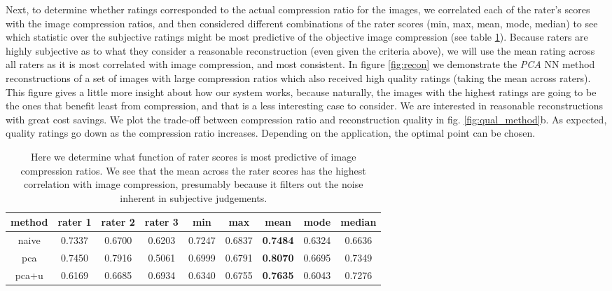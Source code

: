 Next, to determine whether ratings corresponded to the actual compression ratio for the images, we correlated each of the rater's scores with the image compression ratios, and then considered different combinations of the rater scores (min, max, mean, mode, median) to see which statistic over the subjective ratings might be most predictive of the objective image compression (see table \ref{tab:corr}). Because raters are highly subjective as to what they consider a reasonable reconstruction (even given the criteria above), we will use the mean rating across all raters as it is most correlated with image compression, and most consistent. In figure \ref{fig:recon} we demonstrate the \emph{PCA} NN method reconstructions of a set of images with large compression ratios which also received high quality ratings (taking the mean across raters). This figure gives a little more insight about how our system works, because naturally, the images with the highest ratings are going to be the ones that benefit least from compression, and that is a less interesting case to consider. We are interested in reasonable reconstructions with great cost savings. We plot the trade-off between compression ratio and reconstruction quality in fig. \ref{fig:qual_method}b. As expected, quality ratings go down as the compression ratio increases. Depending on the application, the optimal point can be chosen.

\begin{table}
\centering
\begin{tabular}{|c|c|c|c|c|c|c|c|c|}
 \hline
\textbf{method} & \textbf{rater 1} & \textbf{rater 2} & \textbf{rater 3}  & \textbf{min} & \textbf{max} & \textbf{mean} & \textbf{mode} & \textbf{median}\\ \hline
naive & 0.7337 & 0.6700 & 0.6203  & 0.7247 & 0.6837 & \textbf{0.7484} & 0.6324 & 0.6636 \\ \hline
pca & 0.7450 & 0.7916 & 0.5061 & 0.6999 & 0.6791 &  \textbf{0.8070} & 0.6695 & 0.7349 \\ \hline
pca+u & 0.6169 & 0.6685 & 0.6934 & 0.6340 & 0.6755 &  \textbf{0.7635} & 0.6043 & 0.7276  \\ \hline
\end{tabular}
\caption{Here we determine what function of rater scores is most predictive of image compression ratios. We see that the mean across the rater scores has the highest correlation with image compression, presumably because it filters out the noise inherent in subjective judgements.}
\label{tab:corr}
\end{table}

